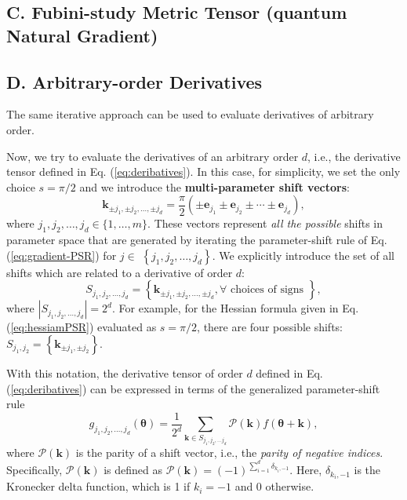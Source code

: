 \subsection{C. Fubini-study Metric Tensor (quantum Natural Gradient)}


\subsection{D. Arbitrary-order Derivatives}

The same iterative approach can be used to evaluate derivatives of arbitrary order. 

Now, we try to evaluate the derivatives of an arbitrary order $d$, i.e., the derivative tensor defined in Eq. (\ref{eq:deribatives}). In this case, for simplicity, we set the only choice $s=\pi / 2$ and we introduce the \textbf{multi-parameter shift vectors}:
\begin{equation}
    \mathbf{k}_{ \pm j_1, \pm j_2, \ldots, \pm j_d}=\frac{\pi}{2}\left( \pm \mathbf{e}_{j_1} \pm \mathbf{e}_{j_2} \pm \cdots \pm \mathbf{e}_{j_d}\right),
\end{equation}
where $j_1, j_2, \ldots, j_d \in \{1,\dots,m\}$. These vectors represent \textit{all the possible} shifts in parameter space that are generated by iterating the parameter-shift rule of Eq. (\ref{eq:gradient-PSR}) for $j \in$ $\left\{j_1, j_2, \ldots, j_d\right\}$. We explicitly introduce the set of all shifts which are related to a derivative of order $d$:
\begin{equation}
    S_{j_1, j_2, \ldots, j_d}=\left\{\mathbf{k}_{ \pm j_1, \pm j_2, \ldots, \pm j_d}, \forall \text { choices of signs }\right\},
\end{equation}
where $\left|S_{j_1, j_2, \ldots, j_d}\right|=2^d$. For example, for the Hessian formula given in Eq. (\ref{eq:hessiamPSR}) evaluated as $s=\pi / 2$, there are four possible shifts: $S_{j_1, j_2}=\left\{\mathbf{k}_{ \pm j_1, \pm j_2}\right\}$.

\begin{theorem}
    With this notation, the derivative tensor of order $d$ defined in Eq. (\ref{eq:deribatives}) can be expressed in terms of the generalized parameter-shift rule
\begin{equation}
    g_{j_1, j_2, \ldots, j_d}(\boldsymbol{\theta})=\frac{1}{2^d} \sum_{\mathbf{k} \in S_{j_1, j_2, \ldots j_d}} \mathcal{P}(\mathbf{k}) f(\boldsymbol{\theta}+\mathbf{k}),
\end{equation}
where $\mathcal{P}(\mathbf{k})$ is the parity of a shift vector, i.e., the \textit{parity of negative indices}. Specifically, $\mathcal{P}(\mathbf{k})$ is defined as $\mathcal{P}(\mathbf{k})=(-1)^{\sum_{i=1}^d \delta_{k_i,-1}}.$ Here, $\delta_{k_i,-1}$ is the Kronecker delta function, which is 1 if $k_i=-1$ and 0 otherwise.
\end{theorem}

